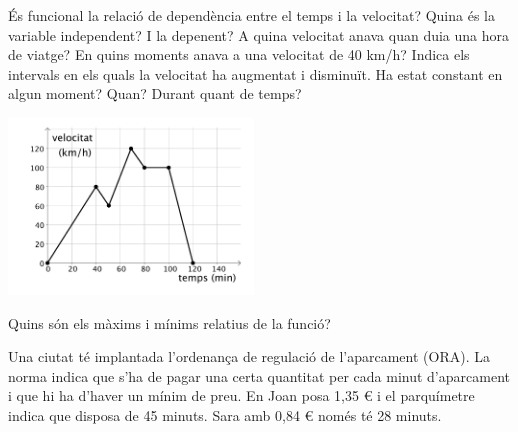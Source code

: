 \begin{mylist}
 
	\begin{minipage}{0.5\textwidth}
	\begin{tasks}
	\task  És funcional la relació de dependència entre el temps i la velocitat?
	\task  Quina és la variable independent? I la depenent?
	\task  A quina velocitat anava quan duia una hora de viatge? En quins moments anava a una velocitat de 40 km/h?
		\task  Indica els intervals en els quals la velocitat ha augmentat i disminuït. Ha estat constant en algun moment? Quan? Durant quant de temps?
	\end{tasks}
	\end{minipage}
	\begin{minipage}{0.5\textwidth}
		\centering
		\includegraphics[width=6.5cm]{img-08/graf43.pdf}
	\end{minipage}
\begin{tasks}
	\task[e)]  Quins són els màxims i mínims relatius de la funció? 
\end{tasks}

 
 
\vspace{-1.75cm}
\exer \begin{minipage}[t]{0.7\textwidth}
	 Una ciutat té implantada l'ordenança de regulació de l'aparcament (ORA). La norma indica que s'ha de pagar una certa quantitat per cada minut d'aparcament i que hi ha d'haver un mínim de preu. En Joan posa 1,35 \euro{} i el parquímetre indica que disposa de 45 minuts. Sara amb 0,84 \euro{} només té 28 minuts.


\end{minipage}
\end{mylist}

